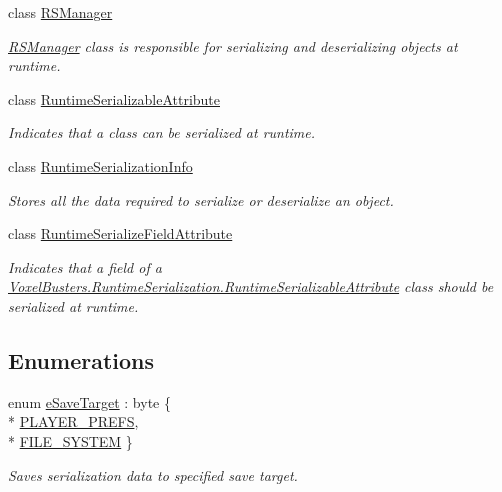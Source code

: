 \begin{DoxyCompactItemize}
class \hyperlink{class_voxel_busters_1_1_runtime_serialization_1_1_r_s_manager}{R\+S\+Manager}
\begin{DoxyCompactList}\small\item\em \hyperlink{class_voxel_busters_1_1_runtime_serialization_1_1_r_s_manager}{R\+S\+Manager} class is responsible for serializing and deserializing objects at runtime. \end{DoxyCompactList}\item 
class \hyperlink{class_voxel_busters_1_1_runtime_serialization_1_1_runtime_serializable_attribute}{Runtime\+Serializable\+Attribute}
\begin{DoxyCompactList}\small\item\em Indicates that a class can be serialized at runtime. \end{DoxyCompactList}\item 
class \hyperlink{class_voxel_busters_1_1_runtime_serialization_1_1_runtime_serialization_info}{Runtime\+Serialization\+Info}
\begin{DoxyCompactList}\small\item\em Stores all the data required to serialize or deserialize an object. \end{DoxyCompactList}\item 
class \hyperlink{class_voxel_busters_1_1_runtime_serialization_1_1_runtime_serialize_field_attribute}{Runtime\+Serialize\+Field\+Attribute}
\begin{DoxyCompactList}\small\item\em Indicates that a field of a \hyperlink{class_voxel_busters_1_1_runtime_serialization_1_1_runtime_serializable_attribute}{Voxel\+Busters.\+Runtime\+Serialization.\+Runtime\+Serializable\+Attribute} class should be serialized at runtime. \end{DoxyCompactList}\end{DoxyCompactItemize}
\subsection*{Enumerations}
\begin{DoxyCompactItemize}
\item 
enum \hyperlink{namespace_voxel_busters_1_1_runtime_serialization_aacaa3008b2cb441fbe4708df854019bf}{e\+Save\+Target} \+: byte \{ \\*
\hyperlink{namespace_voxel_busters_1_1_runtime_serialization_aacaa3008b2cb441fbe4708df854019bfa4cc629b75d0db85993aaa1ceab89775e}{P\+L\+A\+Y\+E\+R\+\_\+\+P\+R\+E\+F\+S}, 
\\*
\hyperlink{namespace_voxel_busters_1_1_runtime_serialization_aacaa3008b2cb441fbe4708df854019bfa47859e0cd44b283c0b013bb759600bf7}{F\+I\+L\+E\+\_\+\+S\+Y\+S\+T\+E\+M}
 \}
\begin{DoxyCompactList}\small\item\em Saves serialization data to specified save target. \end{DoxyCompactList}\end{DoxyCompactItemize}


